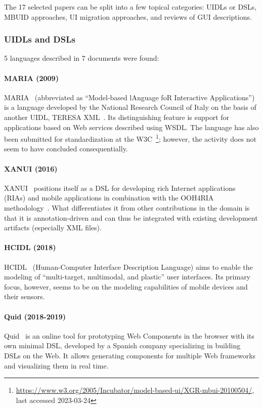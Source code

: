 The 17 selected papers can be split into a few topical categories: UIDLs or DSLs, MBUID approaches, UI migration approaches, and reviews of GUI descriptions.

\subsubsection{UIDLs and DSLs}
5 languages described in 7 documents were found:

\paragraph{MARIA (2009)}
MARIA~\cite{Paterno2009, MariaPDF} (abbreviated as \enquote{Model-based lAnguage foR Interactive Applications}) is a language developed by the National Research Council of Italy on the basis of another UIDL, TERESA XML~\cite{mori2004}.
Its distinguishing feature is support for applications based on Web services described using WSDL\@.
The language has also been submitted for standardization at the W3C~\footnote{\url{https://www.w3.org/2005/Incubator/model-based-ui/XGR-mbui-20100504/}, last accessed 2023-03-24};
however, the activity does not seem to have concluded consequentially.

\paragraph{XANUI (2016)}
XANUI~\cite{hermida2016xanui} positions itself as a DSL for developing rich Internet applications (RIAs) and mobile applications in combination with the OOH4RIA methodology~\cite{Meli2008}.
What differentiates it from other contributions in the domain is that it is annotation-driven and can thus be integrated with existing development artifacts (especially XML files).

\paragraph{HCIDL (2018)}
HCIDL~\cite{Gaouar2018} (Human-Computer Interface Description Language) aims to enable the modeling of \enquote{multi-target, multimodal, and plastic} user interfaces.
Its primary focus, however, seems to be on the modeling capabilities of mobile devices and their sensors.

\paragraph{Quid (2018-2019)}
Quid~\cite{molina2018quid, Molina2019} is an online tool for prototyping Web Components in the browser with its own minimal DSL, developed by a Spanish company specializing in building DSLs on the Web.
It allows generating components for multiple Web frameworks and visualizing them in real time.

